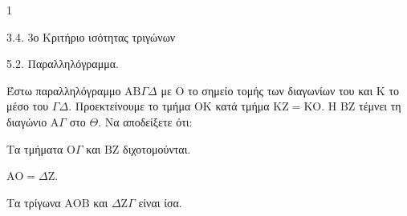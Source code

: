 \begin{ylh}{1}
    \item 3.4. 3ο Κριτήριο ισότητας τριγώνων
    \item 5.2. Παραλληλόγραμμα.
\end{ylh}
Έστω παραλληλόγραμμο $\mathrm{A}\mathrm{B}\Gamma\Delta$ με $\mathrm{O}$ το σημείο τομής των διαγωνίων του και $\mathrm{K}$ το μέσο του $\Gamma\Delta$. Προεκτείνουμε το τμήμα $\mathrm{O}\mathrm{K}$ κατά τμήμα $\mathrm{K}\mathrm{Z} = \mathrm{K}\mathrm{O}$. Η $\mathrm{B}\mathrm{Z}$ τέμνει τη διαγώνιο $\mathrm{A}\Gamma$ στο $\Theta$.
Να αποδείξετε ότι:
\begin{alist}
    \item Τα τμήματα $\mathrm{O}\Gamma$ και $\mathrm{B}\mathrm{Z}$ διχοτομούνται. 
    \item $\mathrm{A}\mathrm{O} = \Delta\mathrm{Z}$. 
    \item Τα τρίγωνα $\mathrm{A}\mathrm{O}\mathrm{B}$ και $\Delta\mathrm{Z}\Gamma$ είναι ίσα. 
\end{alist}
